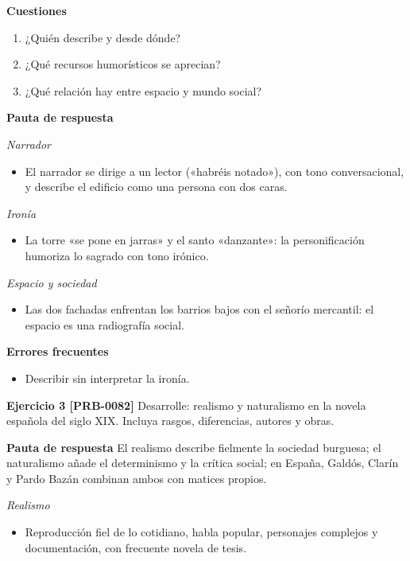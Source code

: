 \documentclass{book}
\begin{document}
\noindent\textbf{Cuestiones}
\begin{enumerate}
\item ¿Quién describe y desde dónde?
\item ¿Qué recursos humorísticos se aprecian?
\item ¿Qué relación hay entre espacio y mundo social?
\end{enumerate}

\noindent\textbf{Pauta de respuesta}

\noindent\textit{Narrador}
\begin{itemize}
\item El narrador se dirige a un lector («habréis notado»), con tono conversacional, y describe el edificio como una persona con dos caras.
\end{itemize}

\noindent\textit{Ironía}
\begin{itemize}
\item La torre «se pone en jarras» y el santo «danzante»: la personificación humoriza lo sagrado con tono irónico.
\end{itemize}

\noindent\textit{Espacio y sociedad}
\begin{itemize}
\item Las dos fachadas enfrentan los barrios bajos con el señorío mercantil: el espacio es una radiografía social.
\end{itemize}

\noindent\textbf{Errores frecuentes}
\begin{itemize}
\item Describir sin interpretar la ironía.
\end{itemize}

\noindent\textbf{Ejercicio 3 [PRB-0082]}
Desarrolle: realismo y naturalismo en la novela española del siglo XIX. Incluya rasgos, diferencias, autores y obras.


\noindent\textbf{Pauta de respuesta}
El realismo describe fielmente la sociedad burguesa; el naturalismo añade el determinismo y la crítica social; en España, Galdós, Clarín y Pardo Bazán combinan ambos con matices propios.


\noindent\textit{Realismo}
\begin{itemize}
\item Reproducción fiel de lo cotidiano, habla popular, personajes complejos y documentación, con frecuente novela de tesis.
\end{itemize}
\end{document}
